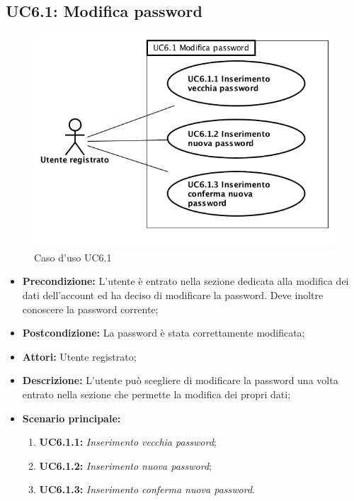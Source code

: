 \newpage
\subsection{ UC6.1: Modifica password}

\begin{figure}[h]
	\begin{center}
	\includegraphics[scale=0.6]{diagram/UC6-1.png}
	\caption{Caso d'uso UC6.1}
	\end{center}
\end{figure}
\begin{itemize}
	\item \textbf{Precondizione:} L’utente è entrato nella sezione dedicata alla modifica dei dati dell’account ed ha deciso di modificare la password. Deve inoltre conoscere la password corrente;
	\item \textbf{Postcondizione:} La password è stata correttamente modificata;
	\item \textbf{Attori:} Utente registrato;
	\item \textbf{Descrizione:} L’utente può scegliere di modificare la password una volta entrato nella sezione che permette la modifica dei propri dati;
	\item \textbf{Scenario principale:}
	\begin{enumerate}
		\item \textbf{ UC6.1.1:} \textit{ Inserimento vecchia password};
		\item \textbf{ UC6.1.2:} \textit{ Inserimento nuova password};
		\item \textbf{ UC6.1.3:} \textit{ Inserimento conferma nuova password}.
	\end{enumerate}
\end{itemize}
